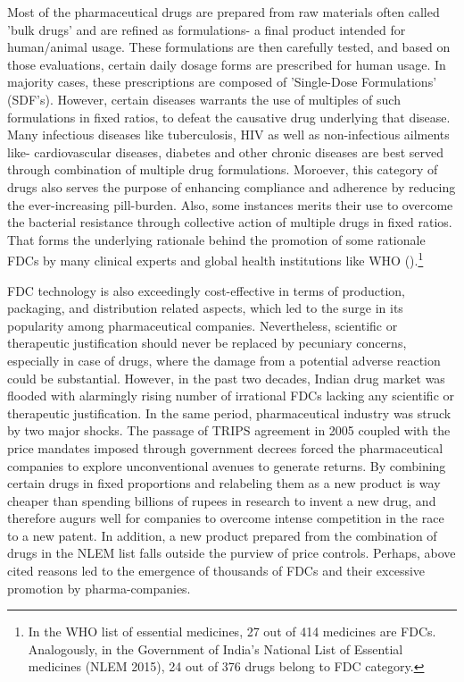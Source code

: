 \documentclass[AER]{AEA}
\theoremstyle{theorem}
\begin{document}
Most of the pharmaceutical drugs are prepared from raw materials often called 'bulk drugs' and are refined as formulations- a final product intended for human/animal usage. These formulations are then carefully tested, and based on those evaluations, certain daily dosage forms are prescribed for human usage. In majority cases, these prescriptions are composed of 'Single-Dose Formulations' (SDF's). However, certain diseases warrants the use of multiples of such formulations in fixed ratios, to defeat the causative drug underlying that disease. Many infectious diseases like tuberculosis, HIV  as well as  non-infectious ailments like- cardiovascular diseases, diabetes and other chronic diseases are best served through combination of multiple drug formulations. Moroever, this category of drugs also serves the purpose of enhancing compliance and adherence by reducing the ever-increasing pill-burden. Also, some instances merits their use to overcome the bacterial resistance through collective action of multiple drugs in fixed ratios. That forms the underlying rationale behind the promotion of some rationale FDCs  by many clinical experts and global health institutions like WHO (\cite{blomberg2001rationale}).\footnote{In the WHO list of essential medicines, 27 out of 414 medicines are FDCs. Analogously, in the Government of India's National List of Essential medicines (NLEM 2015), 24 out of 376 drugs belong to FDC category.} 


FDC technology is also exceedingly cost-effective in terms of production, packaging, and distribution related aspects, which led to the surge in its popularity among pharmaceutical companies. Nevertheless, scientific or therapeutic justification should never be replaced by pecuniary concerns, especially in case of drugs, where the damage from a potential adverse reaction could be substantial. However, in the past two decades, Indian drug market was flooded with alarmingly rising number of irrational FDCs lacking any scientific or therapeutic justification.
In the same period, pharmaceutical industry was struck by two major shocks. The passage of TRIPS agreement in 2005 coupled with the price mandates imposed through government decrees forced the pharmaceutical companies to explore unconventional avenues to generate returns. By combining certain drugs in fixed proportions and relabeling them as a new product is way cheaper than spending billions of rupees in research to invent a new drug, and therefore augurs well for companies to overcome intense competition in the race to a new patent. In addition, a new product prepared from the combination of drugs in the NLEM list falls outside the purview of price controls. Perhaps, above cited reasons led to the emergence of thousands of FDCs and their excessive promotion by pharma-companies.
\end{document}
